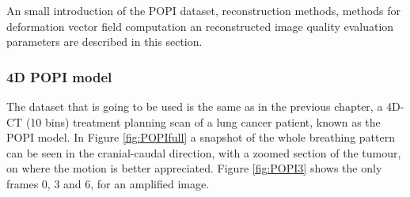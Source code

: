 An small introduction of the POPI dataset, reconstruction methods, methods for deformation vector field computation an reconstructed image quality evaluation parameters are described in this section. 






\subsubsection{4D POPI model}

The dataset that is going to be used is the same as in the previous chapter, a 4D-CT (10 bins) treatment planning scan of a lung cancer patient, known as the POPI model. In Figure \ref{fig:POPIfull} a snapshot of the whole breathing pattern can be seen in the cranial-caudal direction, with a zoomed section of the tumour, on where the motion is better appreciated. Figure \ref{fig:POPI3} shows the only frames 0, 3 and 6, for an amplified image.

